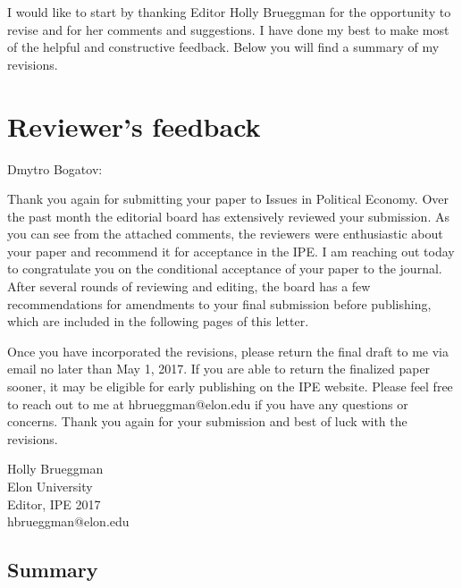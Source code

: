 \documentclass{article}
\newenvironment{itpars}
	{\par\itshape}
	{\par}
\begin{document}
	I would like to start by thanking Editor Holly Brueggman for the opportunity to revise and for her comments and suggestions. I have done my best to make most of the helpful and constructive feedback. Below you will find a summary of my revisions.

	\section*{Reviewer's feedback}

		\begin{itpars}

			Dmytro Bogatov:

			Thank you again for submitting your paper to Issues in Political Economy. Over the past month the editorial board has extensively reviewed your submission. As you can see from the attached comments, the reviewers were enthusiastic about your paper and recommend it for acceptance in the IPE. I am reaching out today to congratulate you on the conditional acceptance of your paper to the journal. After several rounds of reviewing and editing, the board has a few recommendations for amendments to your final submission before publishing, which are included in the following pages of this letter.

			Once you have incorporated the revisions, please return the final draft to me via email no later than May 1, 2017. If you are able to return the finalized paper sooner, it may be eligible for early publishing on the IPE website. Please feel free to reach out to me at hbrueggman@elon.edu if you have any questions or concerns. Thank you again for your submission and best of luck with the revisions.

			Holly Brueggman \\
			Elon University  \\
			Editor, IPE 2017 \\
			hbrueggman@elon.edu

		\end{itpars}

		\subsection*{Summary}
		
\end{document}
